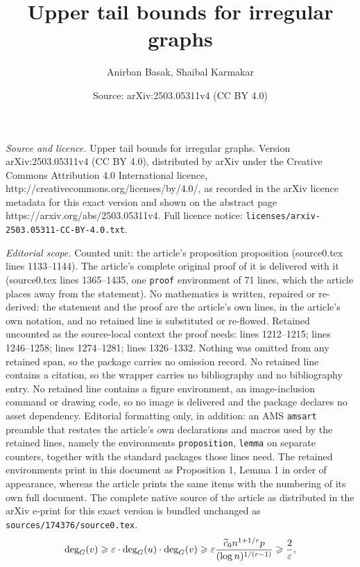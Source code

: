 \documentclass[10pt,a4paper]{amsart}
\title{Upper tail bounds for irregular graphs}
\author{Anirban Basak, Shaibal Karmakar}
\date{Source: arXiv:2503.05311v4 (CC BY 4.0)}
\renewcommand{\geq}{\geqslant}
\newcommand{\tu}[1]{\textup{#1}}
\begin{document}
\maketitle

\noindent\emph{Source and licence.} Upper tail bounds for irregular graphs. Version arXiv:2503.05311v4 (CC BY 4.0), distributed by arXiv under the Creative Commons Attribution 4.0 International licence, http://creativecommons.org/licenses/by/4.0/, as recorded in the arXiv licence metadata for this exact version and shown on the abstract page https://arxiv.org/abs/2503.05311v4. Full licence notice: \texttt{licenses/arxiv-2503.05311-CC-BY-4.0.txt}.\par\smallskip

\noindent\textit{Editorial scope.} Counted unit: the article's proposition proposition (source0.tex lines 1133--1144). The article's complete original proof of it is delivered with it (source0.tex lines 1365--1435, one \texttt{proof} environment of 71 lines, which the article places away from the statement). No mathematics is written, repaired or re-derived: the statement and the proof are the article's own lines, in the article's own notation, and no retained line is substituted or re-flowed.  Retained uncounted as the source-local context the proof needs: lines 1212--1215; lines 1246--1258; lines 1274--1281; lines 1326--1332.  Nothing was omitted from any retained span, so the package carries no omission record.  No retained line contains a citation, so the wrapper carries no bibliography and no bibliography entry.  No retained line contains a figure environment, an image-inclusion command or drawing code, so no image is delivered and the package declares no asset dependency.  Editorial formatting only, in addition: an AMS \texttt{amsart} preamble that restates the article's own declarations and macros used by the retained lines, namely the environments \texttt{proposition}, \texttt{lemma} on separate counters, together with the standard packages those lines need.  The retained environments print in this document as Proposition 1, Lemma 1 in order of appearance, whereas the article prints the same items with the numbering of its own full document.  The complete native source of the article as distributed in the arXiv e-print for this exact version is bundled unchanged as \texttt{sources/174376/source0.tex}.
			\begin{equation}
				\label{bipartite argument}
				\text{deg}_{\tu{G}}(v)\geq \varepsilon\cdot \text{deg}_{\tu{G}}(u)\cdot \text{deg}_{\tu{G}}(v)\geq \varepsilon \frac{\widetilde{c}_{0}n^{1+1/r}p}{(\log n)^{1/(r-1)}} \geq \frac{2}{\varepsilon},
			\end{equation}
\end{document}
